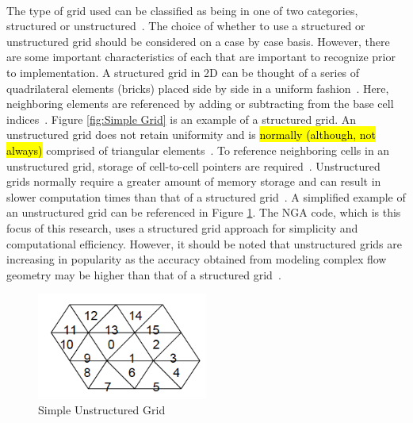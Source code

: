 \paragraph{} The type of grid used can be classified as being in one of two categories, structured or unstructured~\cite{anderson}. The choice of whether to use a structured or unstructured grid should be considered on a case by case basis. However, there are some important characteristics of each that are important to recognize prior to implementation. A structured grid in 2D can be thought of a series of quadrilateral elements (bricks) placed side by side in a uniform fashion~\cite{MIT}. Here, neighboring elements are referenced by adding or subtracting from the base cell indices~\cite{anderson}. Figure \ref{fig:Simple Grid} is an example of a structured grid. An unstructured grid does not retain uniformity and is \hl{normally (although, not always)} comprised of triangular elements~\cite{tu}. To reference neighboring cells in an unstructured grid, storage of cell-to-cell pointers are required~\cite{MIT}. Unstructured grids normally require a greater amount of memory storage and can result in slower computation times than that of a structured grid~\cite{magoules}. A simplified example of an unstructured grid can be referenced in Figure \ref{fig:Unstructured Grid}. The NGA code, which is this focus of this research, uses a structured grid approach for simplicity and computational efficiency. However, it should be noted that unstructured grids are increasing in popularity as the accuracy obtained from modeling complex flow geometry may be higher than that of a structured grid~\cite{Hirt1981}. 

\begin{figure}[htbp]
	\centering
	\includegraphics[width=0.5\textwidth]{figs/unstruc}
	\caption{Simple Unstructured Grid \cite{MIT}}
	\label{fig:Unstructured Grid}
\end{figure}

